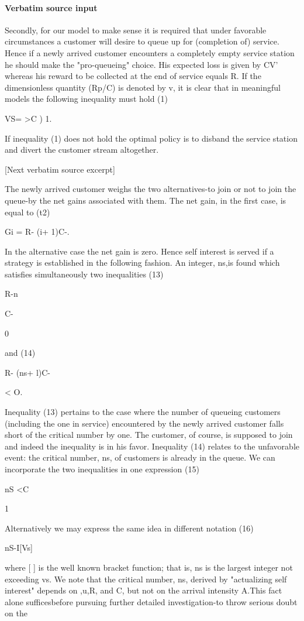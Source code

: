 \documentclass[10pt]{article}
\begin{document}
\paragraph{Verbatim source input}
\begin{ReviewVerbatim}
Secondly, for our model to make sense it is required that under favorable circumstances a customer will desire to queue up for (completion of) service. Hence if a
newly arrived customer encounters a completely empty service station he should
make the "pro-queueing" choice. His expected loss is given by CV' whereas his
reward to be collected at the end of service equals R. If the dimensionless quantity
(Rp/C) is denoted by v, it is clear that in meaningful models the following inequality
must hold
(1)

VS= >C ) 1.

If inequality (1) does not hold the optimal policy is to disband the service station
and divert the customer stream altogether.

[Next verbatim source excerpt]

The newly arrived customer weighs the two alternatives-to join or not to join
the queue-by the net gains associated with them. The net gain, in the first case,
is equal to
(t2)

Gi = R- (i+ 1)C-.

In the alternative case the net gain is zero. Hence self interest is served if a strategy
is established in the following fashion. An integer, ns,is found which satisfies simultaneously two inequalities
(13)

R-n

C-

0

and
(14)

R- (ns+ l)C-

< O.

Inequality (13) pertains to the case where the number of queueing customers
(including the one in service) encountered by the newly arrived customer falls
short of the critical number by one. The customer, of course, is supposed to join
and indeed the inequality is in his favor. Inequality (14) relates to the unfavorable
event: the critical number, ns, of customers is already in the queue. We can incorporate the two inequalities in one expression
(15)

nS <C

1

Alternatively we may express the same idea in different notation
(16)

nS-I[Vs]

where [ ] is the well known bracket function; that is, ns is the largest integer not
exceeding vs.
We note that the critical number, ns, derived by "actualizing self interest" depends on ,u,R, and C, but not on the arrival intensity A.This fact alone sufficesbefore pursuing further detailed investigation-to throw serious doubt on the
\end{ReviewVerbatim}
\end{document}
